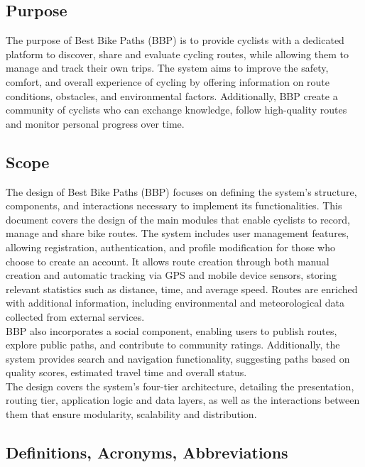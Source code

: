 \subsection{Purpose}
The purpose of Best Bike Paths (BBP) is to provide cyclists with a dedicated platform to discover, share and evaluate cycling routes, while allowing them to manage and track their own trips. The system aims to improve the safety, comfort, and overall experience of cycling by offering information on route conditions, obstacles, and environmental factors. Additionally, BBP create a community of cyclists who can exchange knowledge, follow high-quality routes and monitor personal progress over time.
\subsection{Scope}
The design of Best Bike Paths (BBP) focuses on defining the system’s structure, components, and interactions necessary to implement its functionalities. This document covers the design of the main modules that enable cyclists to record, manage and share bike routes.
The system includes user management features, allowing registration, authentication, and profile modification for those who choose to create an account. It allows route creation through both manual creation and automatic tracking via GPS and mobile device sensors, storing relevant statistics such as distance, time, and average speed. Routes are enriched with additional information, including environmental and meteorological data collected from external services.\\
BBP also incorporates a social component, enabling users to publish routes, explore public paths, and contribute to community ratings. Additionally, the system provides search and navigation functionality, suggesting paths based on quality scores, estimated travel time and overall status.\\
The design covers the system’s four-tier architecture, detailing the presentation, routing tier, application logic and data layers, as well as the interactions between them that ensure modularity, scalability and distribution. 
\subsection{Definitions, Acronyms, Abbreviations}
